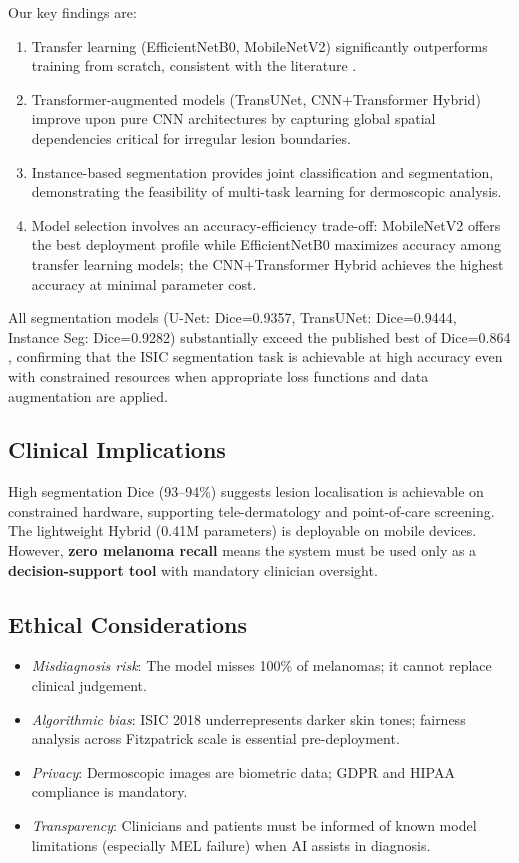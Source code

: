 \documentclass[10pt,twocolumn]{article}
\begin{document}
Our key findings are:
\begin{enumerate}
  \item Transfer learning (EfficientNetB0, MobileNetV2) significantly outperforms training from scratch, consistent with the literature \cite{Esteva2017, Kassem2024}.
  \item Transformer-augmented models (TransUNet, CNN+Transformer Hybrid) improve upon pure CNN architectures by capturing global spatial dependencies critical for irregular lesion boundaries.
  \item Instance-based segmentation provides joint classification and segmentation, demonstrating the feasibility of multi-task learning for dermoscopic analysis.
  \item Model selection involves an accuracy-efficiency trade-off: MobileNetV2 offers the best deployment profile while EfficientNetB0 maximizes accuracy among transfer learning models; the CNN+Transformer Hybrid achieves the highest accuracy at minimal parameter cost.
\end{enumerate}

All segmentation models (U-Net: Dice=0.9357, TransUNet: Dice=0.9444, Instance Seg: Dice=0.9282) substantially exceed the published best of Dice=0.864 \cite{Abraham2019}, confirming that the ISIC segmentation task is achievable at high accuracy even with constrained resources when appropriate loss functions and data augmentation are applied.

\subsection{Clinical Implications}

High segmentation Dice (93--94\%) suggests lesion localisation is achievable on
constrained hardware, supporting tele-dermatology and point-of-care screening.
The lightweight Hybrid (0.41M parameters) is deployable on mobile devices.
However, \textbf{zero melanoma recall} means the system must be used only as a
\textbf{decision-support tool} with mandatory clinician oversight.

\subsection{Ethical Considerations}

\begin{itemize}
  \item \textit{Misdiagnosis risk}: The model misses 100\% of melanomas; it
        cannot replace clinical judgement.
  \item \textit{Algorithmic bias}: ISIC 2018 underrepresents darker skin tones;
        fairness analysis across Fitzpatrick scale is essential pre-deployment.
  \item \textit{Privacy}: Dermoscopic images are biometric data; GDPR and HIPAA
        compliance is mandatory.
  \item \textit{Transparency}: Clinicians and patients must be informed of known
        model limitations (especially MEL failure) when AI assists in diagnosis.
\end{itemize}
\end{document}
